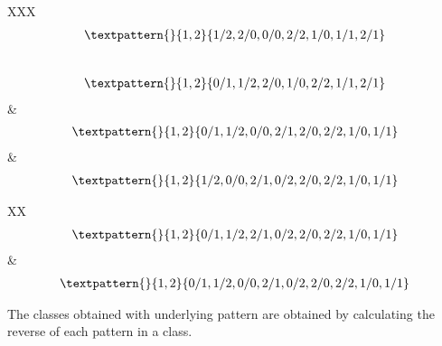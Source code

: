 \begin{center}
\begin{longtabu}[l]{XXX}
\begin{equation}
\begin{gathered}
		\textpattern{}{1,2}{1/2,2/0,0/0,2/2,1/0,1/1,2/1}
	\end{gathered}
	\label{cls:214}
\end{equation}
\\
\begin{equation}
	\begin{gathered}
		\textpattern{}{1,2}{0/1,1/2,2/0,1/0,2/2,1/1,2/1}
	\end{gathered}
	\label{cls:215}
\end{equation}
    &
\begin{equation}
	\begin{gathered}
		\textpattern{}{1,2}{0/1,1/2,0/0,2/1,2/0,2/2,1/0,1/1}
	\end{gathered}
	\label{cls:216}
\end{equation}
    &
\begin{equation}
	\begin{gathered}
		\textpattern{}{1,2}{1/2,0/0,2/1,0/2,2/0,2/2,1/0,1/1}
	\end{gathered}
	\label{cls:217}
\end{equation}
\end{longtabu}
\begin{longtabu}[l]{XX}
\begin{equation}
	\begin{gathered}
		\textpattern{}{1,2}{0/1,1/2,2/1,0/2,2/0,2/2,1/0,1/1}
	\end{gathered}
	\label{cls:218}
\end{equation}
    &
\begin{equation}
	\begin{gathered}
		\textpattern{}{1,2}{0/1,1/2,0/0,2/1,0/2,2/0,2/2,1/0,1/1}
	\end{gathered}
	\label{cls:219}
\end{equation}
\end{longtabu}
\end{center}
The classes obtained with underlying pattern  are obtained by
calculating the reverse of each pattern in a class.
